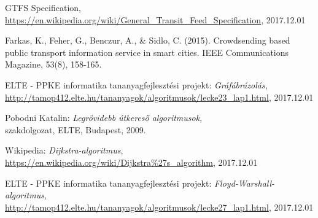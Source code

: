 \begin{thebibliography}{x}
GTFS Specification, \\
\url{https://en.wikipedia.org/wiki/General\_Transit\_Feed\_Specification}, 2017.12.01

Farkas, K., Feher, G., Benczur, A., \& Sidlo, C. (2015). Crowdsending based public transport information service in smart cities. IEEE Communications Magazine, 53(8), 158-165.

ELTE - PPKE informatika tananyagfejlesztési projekt:
\emph{Gráfábrázolás}, \\
\url{http://tamop412.elte.hu/tananyagok/algoritmusok/lecke23\_lap1.html}, 2017.12.01

Pobodni Katalin: \emph{Legrövidebb útkereső algoritmusok}, \\
szakdolgozat, ELTE, Budapest, 2009.

Wikipedia: \emph{Dijkstra-algoritmus}, \\
\url{https://en.wikipedia.org/wiki/Dijkstra\%27s_algorithm}, 2017.12.01

ELTE - PPKE informatika tananyagfejlesztési projekt: \emph{Floyd-Warshall-algoritmus}, \\
\url{http://tamop412.elte.hu/tananyagok/algoritmusok/lecke27\_lap1.html}, 2017.12.01

\end{thebibliography}
